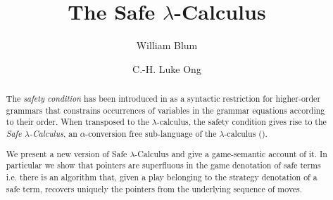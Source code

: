 \documentclass{llncs}
\begin{document}
\frontmatter          %
\pagestyle{headings}  %

\mainmatter              %

\title{The Safe $\lambda$-Calculus}



\author{William Blum \and C.-H. Luke Ong}
%
%



\maketitle              %

\pagestyle{empty}



\begin{abstract}
The \emph{safety condition} has been introduced in \cite{KNU02} as a syntactic restriction for higher-order grammars that constrains occurrences of variables in the grammar equations according to their order.
When transposed to the $\lambda$-calculus, the safety condition gives rise to the \emph{Safe $\lambda$-Calculus}, an $\alpha$-conversion free sub-language of the $\lambda$-calculus (\cite{safety-mirlong2004}).

We present a new version of Safe $\lambda$-Calculus and give a game-semantic account of it. In particular we show that pointers are superfluous in the game denotation of safe terms i.e. there is an algorithm that, given a play belonging to the strategy denotation of a safe term, recovers uniquely the pointers from the underlying sequence of moves.
\end{abstract}
\end{document}
